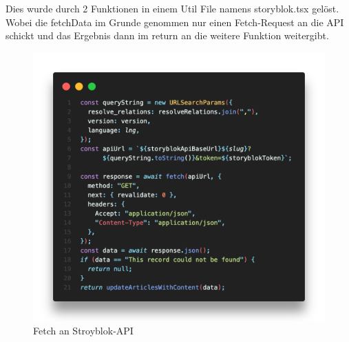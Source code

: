 Dies wurde durch 2 Funktionen in einem Util File namens storyblok.tsx gelöst. 
Wobei die fetchData im Grunde genommen nur einen Fetch-Request an die API schickt und das Ergebnis dann im return an die weitere Funktion weitergibt.
\begin{figure}[H]
    \centering
    \includegraphics[width=\linewidth]{pics/sb-fetch-01.png}
    \caption{Fetch an Stroyblok-API}
\end{figure}

